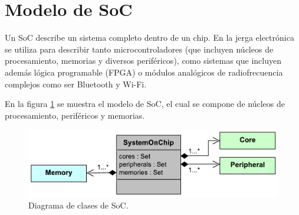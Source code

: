 \section{Modelo de SoC}
\label{sec:modelSoC}

Un SoC describe un sistema completo dentro de un chip. En la jerga electrónica se utiliza para describir tanto microcontroladores (que incluyen núcleos de procesamiento, memorias y diversos periféricos), como sistemas que incluyen además lógica programable (FPGA) o módulos analógicos de radiofrecuencia complejos como ser Bluetooth y Wi-Fi. 

En la figura \ref{fig:ModelSoC} se muestra el modelo de SoC, el cual se compone de núcleos de procesamiento, periféricos y memorias.

\begin{figure}[!htbp]
\begin{center}  %
\includegraphics*[width=14cm]{Figures/SoC.pdf}
\par\caption{Diagrama de clases de SoC.}\label{fig:ModelSoC}
\end{center}
\end{figure}
